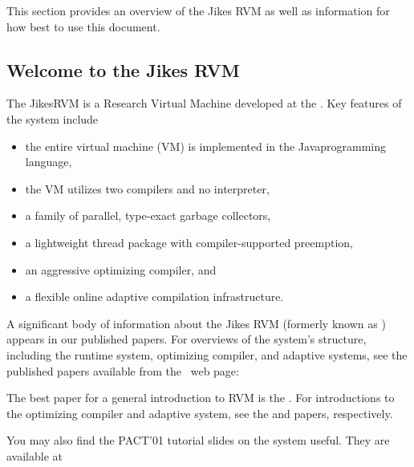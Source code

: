 This section provides an overview of the Jikes RVM as well as
information for how best to use this document.

\subsection{Welcome to the Jikes RVM}

The Jikes\JikesTMFootnote RVM is a Research Virtual Machine 
 developed at the 
.  Key
features of the system include
\begin{itemize}
\item the entire virtual machine (VM) is implemented in the
  Java\JavaTMFootnote  programming language,
\item the VM utilizes two compilers and no interpreter,
\item a family of parallel, type-exact garbage collectors,
\item a lightweight thread package with compiler-supported preemption,
\item an aggressive optimizing compiler, and 
\item a flexible online adaptive compilation infrastructure.
\end{itemize}

A significant body of information about the Jikes RVM 
(formerly known as 
\xlink{\jp}{\JalapenoHomeURL}) appears 
in our published
papers.  For overviews of the system's structure, including the runtime system,
optimizing compiler, and adaptive systems, see the published papers
available from the \jrvm\ web page:
\begin{quote}
\xlink{{\RVMPubsURL}}{\RVMPubsURL}
\end{quote}

The best paper for a general introduction to RVM is 
the 
.  
For introductions to the
optimizing compiler and adaptive system, see the 
{\JavaGrandePaperURL}
 and 
{\OOPSLAPaperURL}  
papers, respectively.

You may also find the PACT'01 tutorial slides on the system useful.
They are available at
\begin{quote}
\xlink{{\RVMSlidesURL}}{\RVMSlidesURL}
\end{quote}

